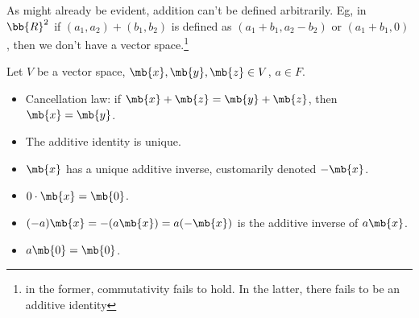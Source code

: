 As might already be evident, addition can't be defined arbitrarily. Eg, in $\bb{R}^2$ if $(a_1,a_2)+(b_1,b_2)$ is defined as $(a_1+b_1,a_2-b_2)$ or $(a_1+b_1,0)$, then we don't have a vector space.\footnote{in the former, commutativity fails to hold. In the latter, there fails to be an additive identity}
\begin{exer}
Let $V$ be a vector space, $\mb{x},\mb{y},\mb{z}\in V$, $a \in F$.
\begin{itemize}
\item Cancellation law: if $\mb{x}+ \mb{z}= \mb{y}+ \mb{z}$, then $\mb{x}= \mb{y}$.
\item The additive identity is unique.
\item $\mb{x}$ has a unique additive inverse, customarily denoted $- \mb{x}$.
\item $0 \cdot \mb{x}= \mb{0}$.
\item $(-a) \mb{x}=-(a \mb{x})=a(- \mb{x})$ is the additive inverse of $a \mb{x}$.
\item $a \mb{0}= \mb{0}$.
\end{itemize}
\end{exer}

